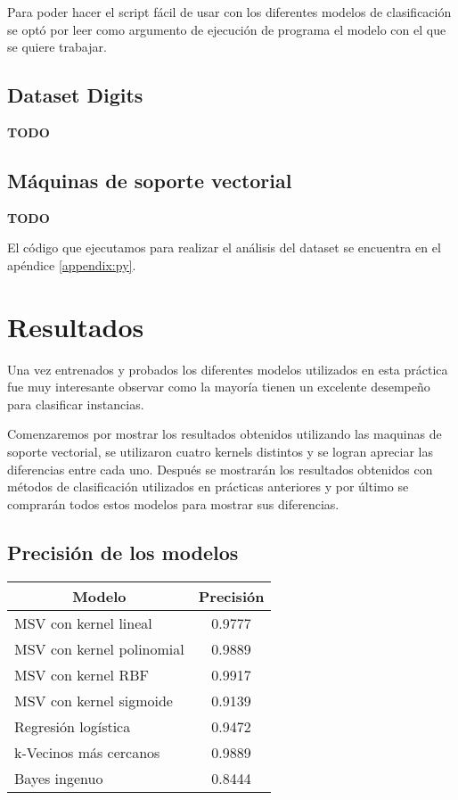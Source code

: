 \documentclass[sigconf,authorversion,nonacm]{acmart}
\begin{document}
Para poder hacer el script fácil de usar con los diferentes modelos de clasificación se optó por leer como argumento de ejecución de programa el modelo con el que se quiere trabajar.


\subsection{Dataset Digits}
\textbf{TODO}


\subsection{Máquinas de soporte vectorial}
\textbf{TODO}

El código que ejecutamos para realizar el análisis del dataset se encuentra en el apéndice \ref{appendix:py}.


\section{Resultados}
Una vez entrenados y probados los diferentes modelos utilizados en esta práctica fue muy interesante observar como la mayoría tienen un excelente desempeño para clasificar instancias.

Comenzaremos por mostrar los resultados obtenidos utilizando las maquinas de soporte vectorial, se utilizaron cuatro kernels distintos y se logran apreciar las diferencias entre cada uno. Después se mostrarán los resultados obtenidos con métodos de clasificación utilizados en prácticas anteriores y por último se comprarán todos estos modelos para mostrar sus diferencias.

\subsection{Precisión de los modelos}
\begin{table}[H]
\begin{tabular}{|l|c|}
\hline
\multicolumn{1}{|c|}{\textbf{Modelo}} & \textbf{Precisión} \\ \hline
MSV con kernel lineal     & 0.9777    \\ \hline
MSV con kernel polinomial & 0.9889    \\ \hline
MSV con kernel RBF        & 0.9917    \\ \hline
MSV con kernel sigmoide   & 0.9139    \\ \hline
Regresión logística       & 0.9472    \\ \hline
k-Vecinos más cercanos    & 0.9889     \\ \hline
Bayes ingenuo             & 0.8444    \\ \hline
\end{tabular}
\end{table}
\end{document}
